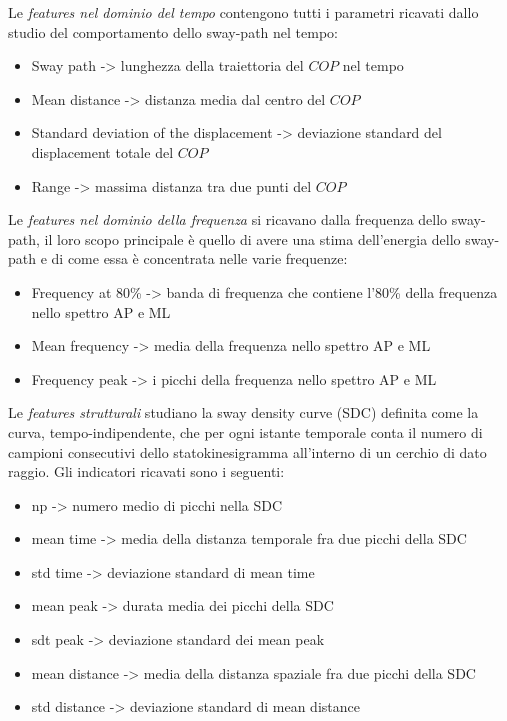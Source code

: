Le {\itshape features nel dominio del tempo} contengono tutti i parametri ricavati dallo studio del comportamento dello sway-path nel tempo: 
\begin{itemize}
    \item Sway path -> lunghezza della traiettoria del $COP$ nel tempo
    \item Mean distance -> distanza media dal centro del $COP$
    \item Standard deviation of the displacement -> deviazione standard del displacement totale del $COP$
    \item Range -> massima distanza tra due punti del $COP$
\end{itemize}

Le {\itshape features nel dominio della frequenza} si ricavano dalla frequenza dello sway-path, il loro scopo principale è quello di avere una stima dell'energia dello sway-path e di come essa è concentrata nelle varie frequenze:
\begin{itemize}
    \item Frequency at 80\% -> banda di frequenza che contiene l'80\% della frequenza nello spettro AP e ML
    \item Mean frequency -> media della frequenza nello spettro AP e ML
    \item Frequency peak -> i picchi della frequenza nello spettro AP e ML
\end{itemize}

Le {\itshape features strutturali} studiano la sway density curve (SDC) definita come la curva, tempo-indipendente, che per ogni istante temporale conta il numero di campioni consecutivi dello statokinesigramma all'interno di un cerchio di dato raggio. Gli indicatori ricavati sono i seguenti:
\begin{itemize}
    \item np -> numero medio di picchi nella SDC
    \item mean time -> media della distanza temporale fra due picchi della SDC
    \item std time -> deviazione standard di mean time
    \item mean peak -> durata media dei picchi della SDC
    \item sdt peak -> deviazione standard dei mean peak
    \item mean distance -> media della distanza spaziale fra due picchi della SDC
    \item std distance -> deviazione standard di mean distance
\end{itemize}

